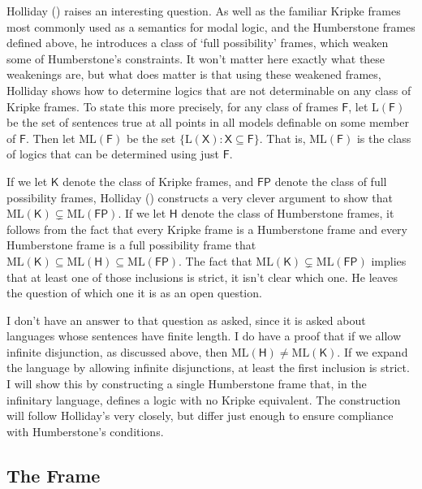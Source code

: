 \documentclass[
  11pt,
  letterpaper,
  DIV=11,
  numbers=noendperiod,
  twoside]{scrartcl}
\begin{document}
Holliday () raises an
interesting question. As well as the familiar Kripke frames most
commonly used as a semantics for modal logic, and the Humberstone frames
defined above, he introduces a class of `full possibility' frames, which
weaken some of Humberstone's constraints. It won't matter here exactly
what these weakenings are, but what does matter is that using these
weakened frames, Holliday shows how to determine logics that are not
determinable on any class of Kripke frames. To state this more
precisely, for any class of frames \(\mathsf{F}\), let
\(\mathrm{L}(\mathsf{F})\) be the set of sentences true at all points in
all models definable on some member of \(\mathsf{F}\). Then let
\(\mathrm{ML}(\mathsf{F})\) be the set
\(\{\mathrm{L}(\mathsf{X}) : \mathsf{X} \subseteq \mathsf{F}\}\). That
is, \(\mathrm{ML}(\mathsf{F})\) is the class of logics that can be
determined using just \(\mathsf{F}\).

If we let \(\mathsf{K}\) denote the class of Kripke frames, and
\(\mathsf{FP}\) denote the class of full possibility frames, Holliday
() constructs a very clever
argument to show that
\(\mathrm{ML}(\mathsf{K}) \subsetneq \mathrm{ML}(\mathsf{FP})\). If we
let \(\mathsf{H}\) denote the class of Humberstone frames, it follows
from the fact that every Kripke frame is a Humberstone frame and every
Humberstone frame is a full possibility frame that
\(\mathrm{ML}(\mathsf{K}) \subseteq \mathrm{ML}(\mathsf{H}) \subseteq \mathrm{ML}(\mathsf{FP})\).
The fact that
\(\mathrm{ML}(\mathsf{K}) \subsetneq \mathrm{ML}(\mathsf{FP})\) implies
that at least one of those inclusions is strict, it isn't clear which
one. He leaves the question of which one it is as an open question.

I don't have an answer to that question as asked, since it is asked
about languages whose sentences have finite length. I do have a proof
that if we allow infinite disjunction, as discussed above, then
\(\mathrm{ML}(\mathsf{H}) \neq \mathrm{ML}(\mathsf{K})\). If we expand
the language by allowing infinite disjunctions, at least the first
inclusion is strict. I will show this by constructing a single
Humberstone frame that, in the infinitary language, defines a logic with
no Kripke equivalent. The construction will follow Holliday's very
closely, but differ just enough to ensure compliance with Humberstone's
conditions.

\subsection*{The Frame}\label{the-frame}
\end{document}
